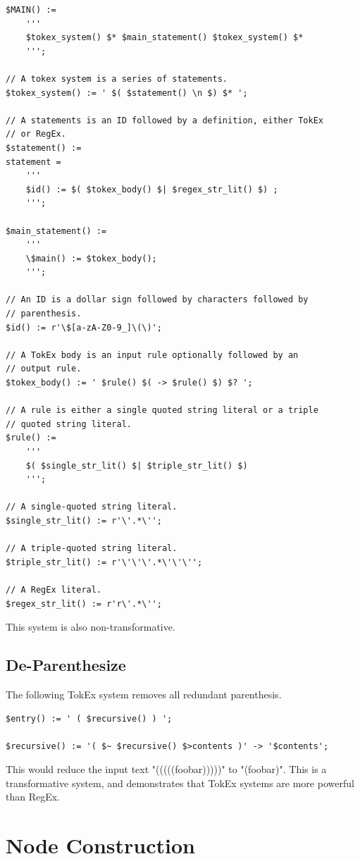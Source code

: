 \documentclass[8pt]{amsart}
\begin{document}
\begin{verbatim}
$MAIN() :=
    '''
    $tokex_system() $* $main_statement() $tokex_system() $*
    ''';

// A tokex system is a series of statements.
$tokex_system() := ' $( $statement() \n $) $* ';

// A statements is an ID followed by a definition, either TokEx
// or RegEx.
$statement() :=
statement =
    '''
    $id() := $( $tokex_body() $| $regex_str_lit() $) ;
    ''';

$main_statement() :=
    '''
    \$main() := $tokex_body();
    ''';

// An ID is a dollar sign followed by characters followed by
// parenthesis.
$id() := r'\$[a-zA-Z0-9_]\(\)';

// A TokEx body is an input rule optionally followed by an
// output rule.
$tokex_body() := ' $rule() $( -> $rule() $) $? ';

// A rule is either a single quoted string literal or a triple
// quoted string literal.
$rule() :=
    '''
    $( $single_str_lit() $| $triple_str_lit() $)
    ''';

// A single-quoted string literal.
$single_str_lit() := r'\'.*\'';

// A triple-quoted string literal.
$triple_str_lit() := r'\'\'\'.*\'\'\'';

// A RegEx literal.
$regex_str_lit() := r'r\'.*\'';

\end{verbatim}

    This system is also non-transformative.

    \subsection{De-Parenthesize}

    The following TokEx system removes all redundant
    parenthesis.

\begin{verbatim}
$entry() := ' ( $recursive() ) ';

$recursive() := '( $~ $recursive() $>contents )' -> '$contents';
\end{verbatim}

    This would reduce the input text "(((((foobar)))))" to
    "(foobar)". This is a transformative system, and
    demonstrates that TokEx systems are more powerful than
    RegEx.

    \section{Node Construction}
\end{document}
